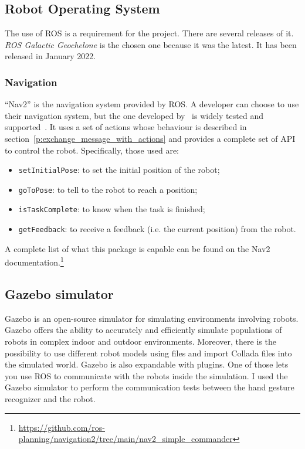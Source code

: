\documentclass[../thesis.tex]{subfiles}
\begin{document}
\subsection{Robot Operating System}
The use of \gls{ROS} is a requirement for the project. There are several releases of it. \textit{ROS Galactic Geochelone} is the chosen one because it was the latest. It has been released in January 2022.

\subsubsection{Navigation}
``Nav2'' is the navigation system provided by \gls{ROS}. A developer can choose to use their navigation system, but the one developed by~\citeauthor{paper:navigation2} is widely tested and supported~\cite{paper:navigation2}. It uses a set of actions whose behaviour is described in section~\ref{p:exchange_message_with_actions} and provides a complete set of API to control the robot. Specifically, those used are:
\begin{itemize}
    \item \texttt{setInitialPose}: to set the initial position of the robot;
    \item \texttt{goToPose}: to tell to the robot to reach a position;
    \item \texttt{isTaskComplete}: to know when the task is finished;
    \item \texttt{getFeedback}: to receive a feedback (i.e. the current position) from the robot.
\end{itemize}
A complete list of what this package is capable can be found on the Nav2 documentation.\footnote{ \href{https://github.com/ros-planning/navigation2/tree/main/nav2_simple_commander}{https://github.com/ros-planning/navigation2/tree/main/nav2\_simple\_commander}}

\subsection{Gazebo simulator}
Gazebo is an open-source simulator for simulating environments involving robots. Gazebo offers the ability to accurately and efficiently simulate populations of robots in complex indoor and outdoor environments. Moreover, there is the possibility to use different robot models using   files and import Collada files into the simulated world. Gazebo is also expandable with plugins. One of those lets you use \acrshort{ROS} to communicate with the robots inside the simulation. I used the Gazebo simulator to perform the communication tests between the hand gesture recognizer and the robot.  
\end{document}
